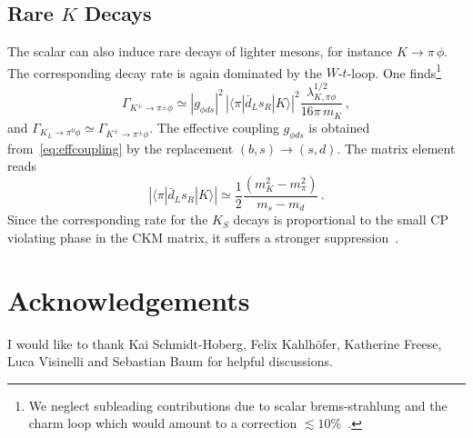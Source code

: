 \documentclass[preprintnumbers,twocolumn,aps,floats,nofootinbib]{revtex4-1}
\begin{document}
\subsection{Rare $K$ Decays}\label{sec:rarek}
The scalar can also induce rare decays of lighter mesons, for instance $K\rightarrow \pi \,\phi$. The corresponding decay rate is again dominated by the $W$-$t$-loop. One finds\footnote{We neglect subleading contributions due to scalar brems-strahlung and the charm loop which would amount to a correction $\lesssim 10\%$~\cite{Leutwyler:1989xj}.}~\cite{Willey:1982ti}
\begin{equation}
\label{eq:Kpiphi}
\Gamma_{K^{\pm} \rightarrow \pi^{\pm}\phi} \simeq
\left|g_{\phi ds}\right|^2\,\left|\langle \pi|\bar{d}_L s_R|K\rangle\right|^2 \frac{\lambda_{K, \pi\phi}^{1/2}}{16\pi\,m_K}\,,
\end{equation}
and $\Gamma_{K_L \rightarrow \pi^0\phi}\simeq\Gamma_{K^{\pm} \rightarrow \pi^{\pm}\phi}$. The effective coupling $g_{\phi ds}$ is obtained from~\eqref{eq:effcoupling} by the replacement $(b,s)\rightarrow (s,d)$. The matrix element reads~\cite{Kamenik:2011vy}
\begin{equation}
 \left|\langle \pi|\bar{d}_L s_R|K\rangle\right| \simeq \frac{1}{2}\frac{(m_K^2-m_\pi^2)}{m_s-m_d}\,.
\end{equation}
Since the corresponding rate for the $K_S$ decays is proportional to the small CP violating phase in the CKM matrix, it suffers a stronger suppression~\cite{Leutwyler:1989xj}.

\section*{Acknowledgements}
I would like to thank Kai Schmidt-Hoberg, Felix Kahlh\"ofer, Katherine Freese, Luca Visinelli and Sebastian Baum for helpful discussions.



\end{document}
